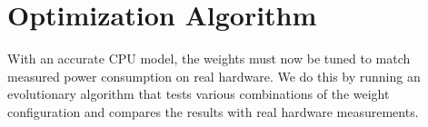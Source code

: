 \section{Optimization Algorithm}

With an accurate CPU model, the weights must now be tuned to match measured
power consumption on real hardware. We do this by running an evolutionary
algorithm that tests various combinations of the weight configuration and
compares the results with real hardware measurements.
